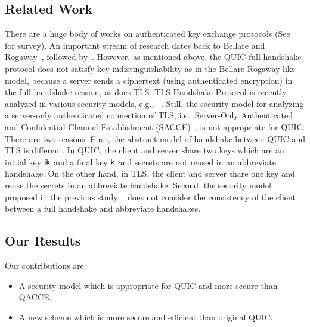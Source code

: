\subsection{Related Work} \label{sec:Related Work}
There are a huge body of works on authenticated key
exchange protocols (See~\cite{CK01:AKE} for survey).
An important stream of research dates back to Bellare
and Rogaway~\cite{BR93:AKE}, followed by~\cite{DB96,
Blei98,JMDP00,JB02,EK09,KK05:TLS,KCRE08,SMOAJ08,KTT11,
Kraw01}.
However, as mentioned above, the QUIC full handshake
protocol does not satisfy key-indistinguishability as
in the Bellare-Rogaway like model, because a server
sends a ciphertext (using authenticated encryption) in
the full handshake session, as does TLS.
TLS Handshake Protocol is recently analyzed in various
security models, e.g., ~\cite{JKSS12:ACCE,KPW13:SACCE,
FS13:ACCE,GKS13:RACCE,BDKSS14:SSH,BFKPSB14:TLS}.
Still, the security model for analyzing a server-only
authenticated connection of TLS, i.e., Server-Only
Authenticated and Confidential Channel Establishment
(SACCE)~\cite{KPW13:SACCE}, is not appropriate for QUIC.
There are two reasons. First, the abstract model of
handshake between QUIC and TLS is different. In QUIC,
the client and server share two keys which are an initial
key $\mathsf{ik}$ and a final key $\mathsf{k}$ and secrets are not
reused in an abbreviate handshake. On the other hand,
in TLS, the client and server share one key and reuse
the secrets in an abbreviate handshake. Second, the
security model proposed in the previous study
~\cite{FG14:QUIC,LJBN15:QUIC} does not
consider the consistency of the client between a full
handshake and abbreviate handshakes.

\subsection{Our Results} \label{sec:proposal}

Our contributions are:
\begin{itemize}
 \item{A security model which is appropriate for QUIC
 and more secure than QACCE.}

 \item{A new scheme which is more secure and efficient
 than original QUIC.}
\end{itemize}

